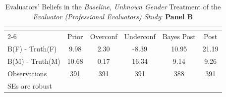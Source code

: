 \begin{table}[htbp]\centering
\caption{Evaluators' Beliefs in the \textit{Baseline, Unknown Gender} Treatment of the \textit{Evaluator (Professional Evaluators) Study}: \textbf{Panel B}}
\begin{tabular}{l*{5}{c}}
\hline\hline
                &\multicolumn{5}{c}{}                             \\\cmidrule(lr){2-6}
                &\multicolumn{1}{c}{Prior}&\multicolumn{1}{c}{Overconf}&\multicolumn{1}{c}{Underconf}&\multicolumn{1}{c}{Bayes Post}&\multicolumn{1}{c}{Post}\\
\hline
B(F) - Truth(F) &     9.98&     2.30&    -8.39&    10.95&    21.19\\
B(M) - Truth(M) &    10.68&     0.17&    16.34&     9.14&     9.26\\
\hline
Observations    &      391&      391&      391&      388&      391\\
\hline\hline
\multicolumn{6}{l}{\footnotesize SEs are robust}\\
\end{tabular}
\end{table}
